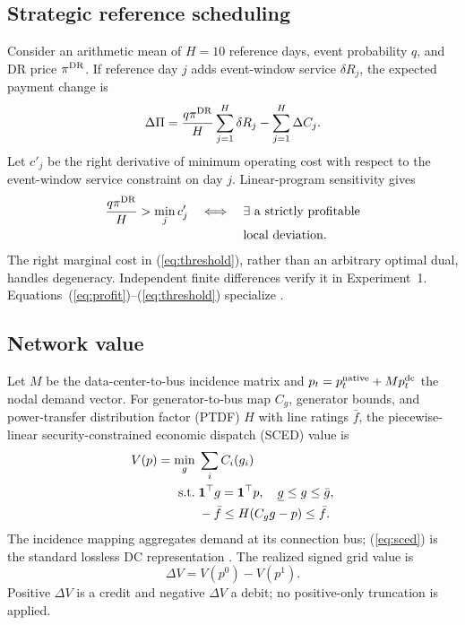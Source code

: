 \documentclass[10pt,journal]{IEEEtran}
\begin{document}
\subsection{Strategic reference scheduling}

Consider an arithmetic mean of $H=10$ reference days, event probability $q$,
and DR price $\pi^{\rm DR}$. If reference day $j$ adds event-window service
$\delta R_j$, the expected payment change is
\begin{equation}
 \Delta\Pi=\frac{q\pi^{\rm DR}}{H}\sum_{j=1}^{H}\delta R_j
 -\sum_{j=1}^{H}\Delta C_j .
 \label{eq:profit}
\end{equation}
Let $c'_j$ be the right derivative of minimum operating cost with respect to
the event-window service constraint on day $j$. Linear-program sensitivity
\cite{boyd2004convex} gives
\begin{equation}
\begin{aligned}
 \frac{q\pi^{\rm DR}}{H}>\min_j c'_j
 \quad\Longleftrightarrow\quad {}&
 \exists\ \text{a strictly profitable}\\[-2pt]
 &\text{local deviation}.
\end{aligned}
 \label{eq:threshold}
\end{equation}
The right marginal cost in (\ref{eq:threshold}), rather than an arbitrary
optimal dual, handles degeneracy. Independent finite differences verify it in
Experiment~1. Equations~(\ref{eq:profit})--(\ref{eq:threshold}) specialize
\cite{wang2022baseline}.

\subsection{Network value}

Let $M$ be the data-center-to-bus incidence matrix and
$p_t=p_t^{\rm native}+Mp_t^{\rm dc}$ the nodal demand vector. For
generator-to-bus map $C_g$, generator bounds, and power-transfer distribution
factor (PTDF) $H$ with line ratings $\bar f$, the
piecewise-linear security-constrained economic dispatch (SCED) value is
\begin{align}
 V(p)=\min_g\;&\sum_i C_i(g_i) \label{eq:sced}\\
 {\rm s.t.}\;&\mathbf1^\top g=\mathbf1^\top p,\quad
 \underline g\leq g\leq\bar g,\nonumber\\
 &-\bar f\leq H(C_gg-p)\leq\bar f.\nonumber
\end{align}
The incidence mapping aggregates demand at its connection bus; (\ref{eq:sced})
is the standard lossless DC representation \cite{stott2009dc,zimmerman2011matpower}.
The realized signed grid value is
\begin{equation}
 \Delta V=V(p^0)-V(p^1). \label{eq:value}
\end{equation}
Positive $\Delta V$ is a credit and negative $\Delta V$ a debit; no
positive-only truncation is applied.
\end{document}
